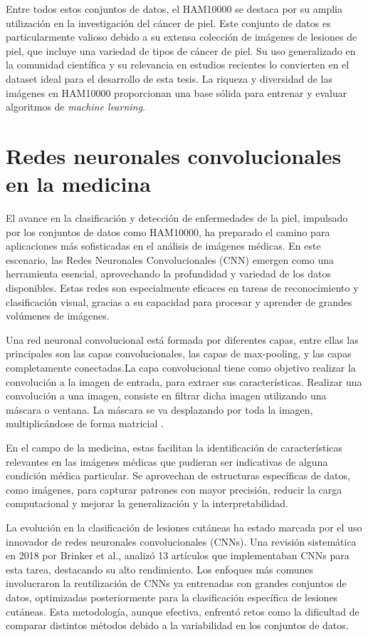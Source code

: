 Entre todos estos conjuntos de datos, el HAM10000 se destaca por su amplia utilización en la investigación del cáncer de piel. Este conjunto de datos es particularmente valioso debido a su extensa colección de imágenes de lesiones de piel, que incluye una variedad de tipos de cáncer de piel. Su uso generalizado en la comunidad científica y su relevancia en estudios recientes lo convierten en el dataset ideal para el desarrollo de esta tesis. La riqueza y diversidad de las imágenes en HAM10000 proporcionan una base sólida para entrenar y evaluar algoritmos de \textit{machine learning}.

\section{Redes neuronales convolucionales en la medicina}   
El avance en la clasificación y detección de enfermedades de la piel, impulsado por los conjuntos de datos como HAM10000, ha preparado el camino para aplicaciones más sofisticadas en el análisis de imágenes médicas. En este escenario, las Redes Neuronales Convolucionales (CNN) emergen como una herramienta esencial, aprovechando la profundidad y variedad de los datos disponibles. Estas redes son especialmente eficaces en tareas de reconocimiento y clasificación visual, gracias a su capacidad para procesar y aprender de grandes volúmenes de imágenes.

Una red neuronal convolucional está formada por diferentes capas, entre ellas las principales son las capas convolucionales, las capas de max-pooling, y las capas completamente conectadas.La capa convolucional tiene como objetivo realizar la convolución a la imagen de entrada, para extraer sus características. Realizar una convolución a una imagen, consiste en filtrar dicha imagen utilizando una máscara o ventana. La máscara se va desplazando por toda la imagen, multiplicándose de forma matricial .

En el campo de la medicina, estas facilitan la identificación de características relevantes en las imágenes médicas que pudieran ser indicativas de alguna condición médica particular. Se aprovechan de estructuras específicas de datos, como imágenes, para capturar patrones con mayor precisión, reducir la carga computacional y mejorar la generalización y la interpretabilidad. 

La evolución en la clasificación de lesiones cutáneas ha estado marcada por el uso innovador de redes neuronales convolucionales (CNNs). Una revisión sistemática en 2018 por Brinker et al.,  analizó 13 artículos que implementaban CNNs para esta tarea, destacando su alto rendimiento. Los enfoques más comunes involucraron la reutilización de CNNs ya entrenadas con grandes conjuntos de datos, optimizadas posteriormente para la clasificación específica de lesiones cutáneas. Esta metodología, aunque efectiva, enfrentó retos como la dificultad de comparar distintos métodos debido a la variabilidad en los conjuntos de datos.


